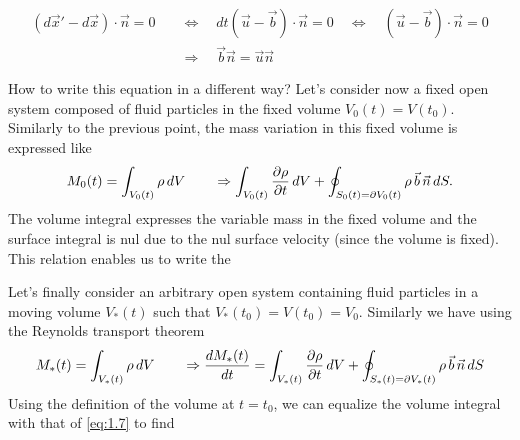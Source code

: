 	\begin{equation}
	\begin{aligned}
		(d\vec{x}'-d\vec{x})\cdot \vec{n} = 0 \quad &\Leftrightarrow \quad dt (\vec{u}-\vec{b})\cdot \vec{n} = 0 \quad \Leftrightarrow \quad (\vec{u}-\vec{b})\cdot \vec{n} = 0 \\
		&\Rightarrow \quad \vec{b} \vec{n} = \vec{u} \vec{n}
		\end{aligned}
	\end{equation}
	\begin{center}
	\end{center}
	
	How to write this equation in a different way? Let's consider now a fixed open system composed of fluid particles in the fixed volume $V_0(t) = V(t_0)$. Similarly to the previous point, the mass variation in this fixed volume is expressed like 
	\begin{equation}
		M_0(t) = \int _{V_0(t)} \rho\, dV \qquad 
		\Rightarrow \int _{V_0(t)} \frac{\D \rho}{\D t}\, dV + \oint _{S_0(t) = \D V_0(t)} \rho\, \vec{b}\, \vec{n}\, dS.
	\end{equation}
	The volume integral expresses the variable mass in the fixed volume and the surface integral is nul due to the nul surface velocity (since the volume is fixed). This relation enables us to write the 
	\begin{center}
	\end{center}	
	Let's finally consider an arbitrary open system containing fluid particles in a moving volume $V_*(t)$ such that $V_*(t_0) = V(t_0) = V_0$. Similarly we have using the Reynolds transport theorem
	\begin{equation}
		M_*(t) = \int _{V_*(t)} \rho\, dV \qquad \Rightarrow \frac{dM_*(t)}{dt} = \int _{V_*(t)} \frac{\D \rho}{\D t}\, dV + \oint _{S_*(t) = \D V_*(t)} \rho\, \vec{b}\, \vec{n}\, dS
	\end{equation}
	Using the definition of the volume at $t=t_0$, we can equalize the volume integral with that of \eqref{eq:1.7} to find 
	\begin{center}
	\end{center}	
	
